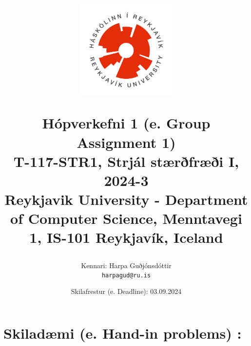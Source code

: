 \documentclass[12pt]{article}
\title{
\centerline{\includegraphics[width=50mm]{images/ru_logo.jpg}}
Hópverkefni 1 (e. Group Assignment 1)
\large  \\
T-117-STR1, Strjál stærðfræði I, 2024-3 \\ 
\small Reykjavik University - Department of Computer Science, Menntavegi 1, IS-101 Reykjavík, Iceland 
  }
\author{
    Kennari: Harpa Guðjónsdóttir\\
    \texttt{harpagud@ru.is}
}
\date{Skilafrestur (e. Deadline): 03.09.2024}
\begin{document}
\maketitle

\section*{\textbf{Skiladæmi (e. Hand-in problems) :}}






\end{document}
